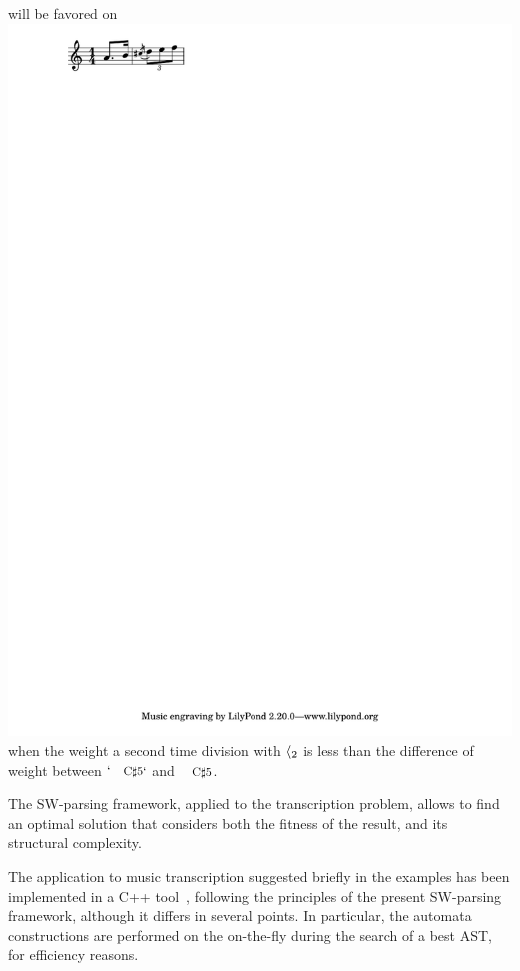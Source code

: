 \begin{example}
will be favored on
\includegraphics[scale=0.35,trim=0 5mm 0 0]{pictures/ex2.pdf}
when the weight a second time division with $\langle_{2}$ is less
than the difference of weight between
$\mbox{`\footnotesize C$\sharp$5`}$
and $\mbox{\footnotesize C$\sharp$5}$.

\noindent
The SW-parsing framework, applied to the transcription problem,
allows to find an optimal solution
that considers both the fitness of the result,
and its structural complexity.
\endex
\end{example}
The application to music transcription suggested briefly in the examples
has been implemented in a C++ tool~\cite{qparse}, %
following the principles of the present SW-parsing framework, 
although it differs in several points.
In particular, the automata constructions are performed on the on-the-fly
during the search of a best AST, for efficiency reasons.


